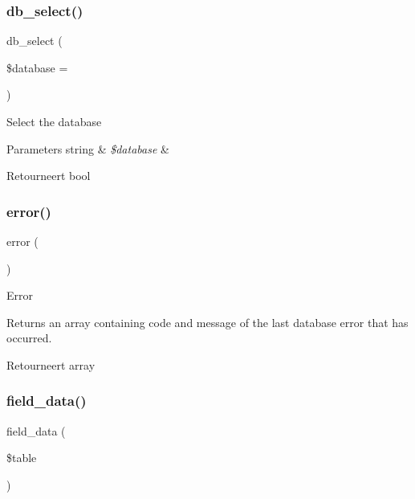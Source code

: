 \subsubsection{\texorpdfstring{db\_select()}{db\_select()}}
{\footnotesize\ttfamily db\+\_\+select (\begin{DoxyParamCaption}\item[{}]{\$database = {\ttfamily \textquotesingle{}\textquotesingle{}} }\end{DoxyParamCaption})}

Select the database


\begin{DoxyParams}[1]{Parameters}
string & {\em \$database} & \\
\hline
\end{DoxyParams}
\begin{DoxyReturn}{Retourneert}
bool 
\end{DoxyReturn}
\mbox{\label{class_c_i___d_b__mysqli__driver_a43b8d30b879d4f09ceb059b02af2bc02}} 
\subsubsection{\texorpdfstring{error()}{error()}}
{\footnotesize\ttfamily error (\begin{DoxyParamCaption}{ }\end{DoxyParamCaption})}

Error

Returns an array containing code and message of the last database error that has occurred.

\begin{DoxyReturn}{Retourneert}
array 
\end{DoxyReturn}
\mbox{\label{class_c_i___d_b__mysqli__driver_a90355121e1ed009e0efdbd544ab56efa}} 
\subsubsection{\texorpdfstring{field\_data()}{field\_data()}}
{\footnotesize\ttfamily field\+\_\+data (\begin{DoxyParamCaption}\item[{}]{\$table }\end{DoxyParamCaption})}


